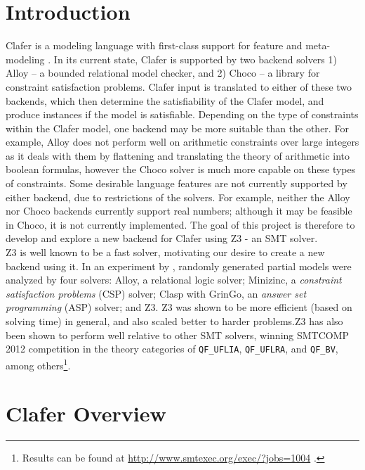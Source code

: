 \documentclass{article}
\begin{document}
\section{Introduction}
Clafer is a modeling language with first-class support for feature and meta-modeling \cite{BakClaferSLE2010}. In its current state, Clafer is supported by two backend solvers 1) Alloy -- a bounded relational model checker, and 2) Choco -- a library for constraint satisfaction problems. Clafer input is translated to either of these two backends, which then determine the satisfiability of the Clafer model, and produce instances if the model is satisfiable. Depending on the type of constraints within the Clafer model, one backend may be more suitable than the other. For example, Alloy does not perform well on arithmetic constraints over large integers as it deals with them by flattening and translating the theory of arithmetic into boolean formulas, however the Choco solver is much more capable on these types of constraints. Some desirable language features are not currently supported by either backend, due to restrictions of the solvers. For example, neither the Alloy nor Choco backends currently support real numbers; although it may be feasible in Choco, it is not currently implemented. The goal of this project is therefore to  develop and explore a new backend for Clafer using Z3 - an SMT solver. \\
\indent Z3 is well known to be a fast solver, motivating our desire to create a new backend using it. In an experiment by \cite{Saadatpanah2012}, randomly generated partial models were analyzed by four solvers: Alloy, a relational logic solver; Minizinc, a  \textit{constraint satisfaction problems} (CSP) solver; Clasp with GrinGo, an \textit{answer set programming} (ASP) solver; and Z3. Z3 was shown to be more efficient (based on solving time) in general, and also scaled better to harder problems.Z3 has also been shown to perform well relative to other SMT solvers, winning SMTCOMP 2012 competition in the theory categories of \texttt{QF\_UFLIA}, \texttt{QF\_UFLRA}, and \texttt{QF\_BV}, among others\footnote{Results can be found at \url{http://www.smtexec.org/exec/?jobs=1004} .}.

\section{Clafer Overview}
\end{document}
